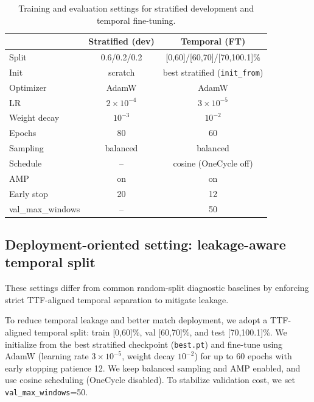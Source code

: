 \documentclass{article}
\begin{document}
\begin{table}[htbp]
\centering
\begin{tabular}{lcc}
\hline
 & Stratified (dev) & Temporal (FT) \\
\hline
Split & 0.6/0.2/0.2 & [0,60]/[60,70]/[70,100.1]\% \\
Init & scratch & best stratified (\texttt{init\_from}) \\
Optimizer & AdamW & AdamW \\
LR & $2\times10^{-4}$ & $3\times10^{-5}$ \\
Weight decay & $10^{-3}$ & $10^{-2}$ \\
Epochs & 80 & 60 \\
Sampling & balanced & balanced \\
Schedule & -- & cosine (OneCycle off) \\
AMP & on & on \\
Early stop & 20 & 12 \\
val\_max\_windows & -- & 50 \\
\hline
\end{tabular}
\caption{Training and evaluation settings for stratified development and temporal fine-tuning.}
\label{tab:settings}
\end{table}

\subsection{Deployment-oriented setting: leakage-aware temporal split}
These settings differ from common random-split diagnostic baselines by enforcing strict TTF-aligned temporal separation to mitigate leakage.

To reduce temporal leakage and better match deployment, we adopt a TTF-aligned temporal split: train [0,60]\%, val [60,70]\%, and test [70,100.1]\%. 
We initialize from the best stratified checkpoint (\texttt{best.pt}) and fine-tune using AdamW (learning rate $3\times10^{-5}$, weight decay $10^{-2}$) for up to 60 epochs with early stopping patience 12. 
We keep balanced sampling and AMP enabled, and use cosine scheduling (OneCycle disabled). 
To stabilize validation cost, we set \texttt{val\_max\_windows}=50.
\end{document}
